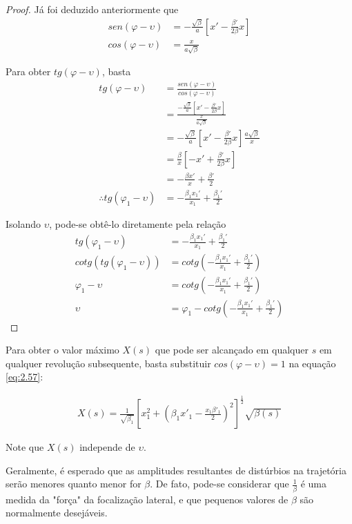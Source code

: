 \begin{proof}
	Já foi deduzido anteriormente que
	\begin{align*}
        sen(\varphi-\upsilon) &= -\frac{\sqrt{\beta}}{a}\left[x' - \frac{\beta'}{2\beta}x\right]\\
        cos(\varphi-\upsilon) &= \frac{x}{a\sqrt{\beta}}
	\end{align*}
	
	Para obter $tg(\varphi-\upsilon)$, basta
	\begin{align*}
		tg(\varphi-\upsilon) &= \frac{sen(\varphi-\upsilon)}{cos(\varphi-\upsilon)}\\
							 &= \frac{-\frac{\sqrt{\beta}}{a}\left[x' - \frac{\beta'}{2\beta}x\right]}{\frac{x}{a\sqrt{\beta}}}\\
							 &= -\frac{\sqrt{\beta}}{a}\left[x' - \frac{\beta'}{2\beta}x\right] \frac{a\sqrt{\beta}}{x}\\
							 &= \frac{\beta}{x}\left[-x' + \frac{\beta'}{2\beta}x\right]\\
							 &= -\frac{\beta x'}{x} + \frac{\beta'}{2}\\
		\therefore tg(\varphi_1-\upsilon) &= -\frac{\beta_1  x_1'}{x_1} + \frac{\beta_1'}{2}
	\end{align*}
	
	Isolando $\upsilon$, pode-se obtê-lo diretamente pela relação
	\begin{align*}
		tg(\varphi_1-\upsilon) &= -\frac{\beta_1  x_1'}{x_1} + \frac{\beta_1'}{2}\\
		cotg(tg(\varphi_1-\upsilon)) &= cotg\left(-\frac{\beta_1  x_1'}{x_1} + \frac{\beta_1'}{2}\right)\\
		\varphi_1-\upsilon &= cotg\left(-\frac{\beta_1  x_1'}{x_1} + \frac{\beta_1'}{2}\right)\\
		\upsilon &= \varphi_1 - cotg\left(-\frac{\beta_1  x_1'}{x_1} + \frac{\beta_1'}{2}\right)
	\end{align*}
\end{proof}
	
Para obter o valor máximo $X(s)$ que pode ser alcançado em qualquer $s$ em qualquer revolução subsequente, basta substituir $cos(\varphi-\upsilon)=1$ na equação \eqref{eq:2.57}:
	
\begin{align}
	X(s) = \frac{1}{\sqrt{\beta_1}}\left[x_1^2+\left(\beta_1x'_1-\frac{x_1\beta'_1}{2}\right)^2\right]^\frac{1}{2}\sqrt{\beta(s)}
\end{align}
	
Note que $X(s)$ independe de $\upsilon$.
	
Geralmente, é esperado que as amplitudes resultantes de distúrbios na trajetória serão menores quanto menor for $\beta$. De fato, pode-se considerar que $\frac{1}{\beta}$ é uma medida da "força" da focalização lateral, e que pequenos valores de $\beta$ são normalmente desejáveis. 